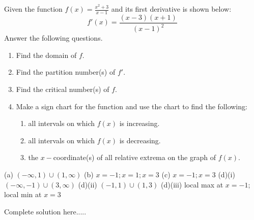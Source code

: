 \begin{example}
Given the function $f(x)=\displaystyle\frac{x^2+3}{x-1}$ and its first derivative is shown below:
\begin{equation*}
    f'(x)=\frac{(x-3)(x+1)}{(x-1)^2}
\end{equation*}
Answer the following questions.
\renewcommand{\labelenumi}{(\alph{enumi})}
\begin{enumerate}[leftmargin=*]
    \item Find the domain of $f$. \vspace{1in}
    \item Find the partition number(s) of $f'$. \vspace{1in}
    \item Find the critical number(s) of $f$. \vspace{1cm}
    \item Make a sign chart for the function and use the chart to find the following:\vspace{0.75in}
    \renewcommand{\labelenumii}{(\roman{enumii})}
    \begin{enumerate}
        \item all intervals on which $f(x)$ is increasing.\vspace{1cm}
        \item all intervals on which $f(x)$ is decreasing.\vspace{1cm}
        \item the $x-$coordinate(s) of all relative extrema on the graph of $f(x)$. \vspace{1cm}
    \end{enumerate}
    
\end{enumerate}
    \begin{sol}
    (a) $(-\infty,1)\cup (1,\infty)$ (b) $x=-1;x=1;x=3$ (c) $x=-1;x=3$ (d)(i) $(-\infty,-1)\cup (3,\infty)$ (d)(ii) $(-1,1)\cup (1,3)$ (d)(iii) local max at $x=-1$; local min at $x=3$
    \end{sol}
    \begin{solL}
    Complete solution here.....
    
    \end{solL}
    
\end{example}

